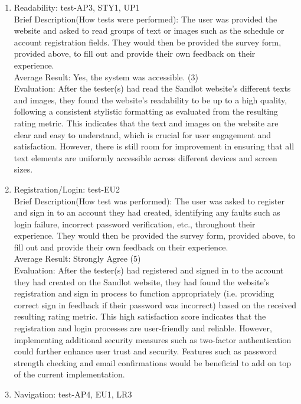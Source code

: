 \documentclass[12pt, titlepage]{article}
\begin{document}
\begin{enumerate}
  \item{Readability: test-AP3, STY1, UP1\\}
  Brief Description(How tests were performed): The user was provided the website and asked
  to read groups of text or images such as the schedule or account registration fields.
  They would then be provided the survey form, provided above, to fill out and provide their own feedback
  on their experience. \\
  Average Result: Yes, the system was accessible. (3)\\
  Evaluation: After the tester(s) had read the Sandlot website's different texts and images,
  they found the website's readability to be up to a high quality, following a consistent
  stylistic formatting as evaluated from the resulting rating metric. This indicates that the
  text and images on the website are clear and easy to understand, which is crucial for user
  engagement and satisfaction. However, there is still room for improvement in ensuring that
  all text elements are uniformly accessible across different devices and screen sizes.
  \item{Registration/Login: test-EU2\\}
  Brief Description(How test was performed): The user was asked to register and sign in to
  an account they had created, identifying any faults such as login failure, incorrect
  password verification, etc., throughout their experience. They would then be provided the survey form, provided above, to fill
  out and provide their own feedback on their experience. \\
  Average Result: Strongly Agree (5)\\
  Evaluation: After the tester(s) had registered and signed in to the account they had
  created on the Sandlot website, they had found the website's registration and sign in process
  to function appropriately (i.e. providing correct sign in feedback if their password was
  incorrect) based on the received resulting rating metric. This high satisfaction score indicates
  that the registration and login processes are user-friendly and reliable. However, implementing
  additional security measures such as two-factor authentication could further enhance user trust
  and security. Features such as password strength checking and email confirmations would be
  beneficial to add on top of the current implementation.
  \item{Navigation: test-AP4, EU1, LR3\\}

\end{enumerate}
\end{document}
